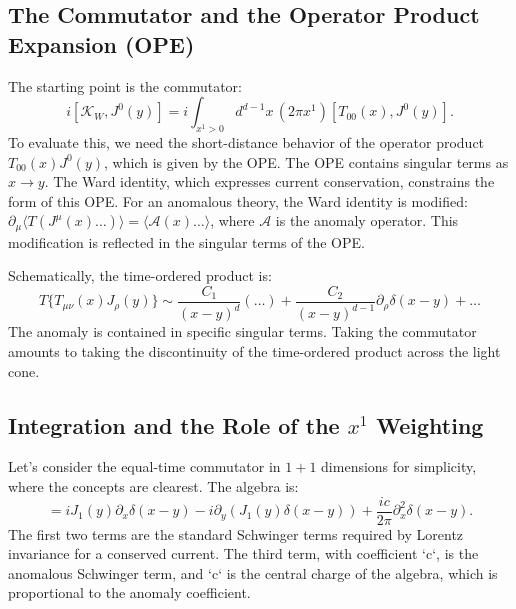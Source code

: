 \documentclass[11pt, letterpaper]{report}
\theoremstyle{plain} %
\theoremstyle{definition} %
\theoremstyle{remark} %
\newcommand{\ModularK}{\mathcal{K}}
\begin{document}
\subsection{The Commutator and the Operator Product Expansion (OPE)}
The starting point is the commutator:
\begin{equation}
    i[\ModularK_W, J^0(y)] = i \int_{x^1>0} d^{d-1}x \, (2\pi x^1) [T_{00}(x), J^0(y)].
\end{equation}
To evaluate this, we need the short-distance behavior of the operator product $T_{00}(x) J^0(y)$, which is given by the OPE. The OPE contains singular terms as $x \to y$. The Ward identity, which expresses current conservation, constrains the form of this OPE. For an anomalous theory, the Ward identity is modified: $\partial_\mu \langle T(J^\mu(x) \dots) \rangle = \langle \mathcal{A}(x) \dots \rangle$, where $\mathcal{A}$ is the anomaly operator. This modification is reflected in the singular terms of the OPE.

Schematically, the time-ordered product is:
\begin{equation}
    T\{T_{\mu\nu}(x) J_\rho(y)\} \sim \frac{C_1}{(x-y)^d} (\dots) + \frac{C_2}{(x-y)^{d-1}} \partial_\rho \delta(x-y) + \dots
\end{equation}
The anomaly is contained in specific singular terms. Taking the commutator amounts to taking the discontinuity of the time-ordered product across the light cone.

\subsection{Integration and the Role of the \texorpdfstring{$x^1$}{x1} Weighting}
Let's consider the equal-time commutator in $1+1$ dimensions for simplicity, where the concepts are clearest. The algebra is:
\begin{equation}
    [T_{00}(x), J_0(y)] = i J_1(y) \partial_x \delta(x-y) - i \partial_y (J_1(y)\delta(x-y)) + \frac{ic}{2\pi} \partial_x^2 \delta(x-y).
\end{equation}
The first two terms are the standard Schwinger terms required by Lorentz invariance for a conserved current. The third term, with coefficient `c`, is the anomalous Schwinger term, and `c` is the central charge of the algebra, which is proportional to the anomaly coefficient.
\end{document}

